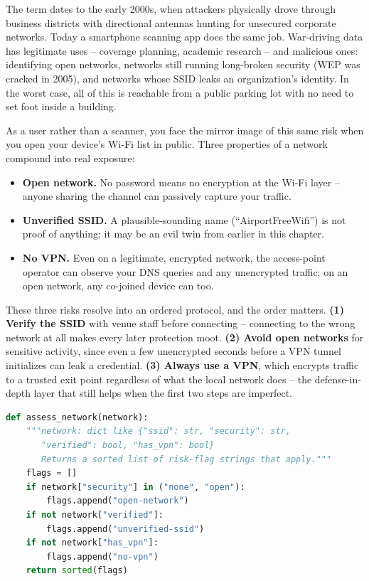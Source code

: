The term dates to the early 2000s, when attackers physically drove through business districts
with directional antennas hunting for unsecured corporate networks. Today a smartphone scanning
app does the same job. War-driving data has legitimate uses -- coverage planning, academic
research -- and malicious ones: identifying open networks, networks still running long-broken
security (WEP was cracked in 2005), and networks whose SSID leaks an organization's identity. In
the worst case, all of this is reachable from a public parking lot with no need to set foot
inside a building.

As a user rather than a scanner, you face the mirror image of this same risk when you open your
device's Wi-Fi list in public. Three properties of a network compound into real exposure:

\begin{itemize}
\item \textbf{Open network.} No password means no encryption at the Wi-Fi layer -- anyone
sharing the channel can passively capture your traffic.
\item \textbf{Unverified SSID.} A plausible-sounding name (``AirportFreeWifi'') is not proof of
anything; it may be an evil twin from earlier in this chapter.
\item \textbf{No VPN.} Even on a legitimate, encrypted network, the access-point operator can
observe your DNS queries and any unencrypted traffic; on an open network, any co-joined device
can too.
\end{itemize}

These three risks resolve into an ordered protocol, and the order matters. \textbf{(1) Verify the
SSID} with venue staff before connecting -- connecting to the wrong network at all makes every
later protection moot. \textbf{(2) Avoid open networks} for sensitive activity, since even a few
unencrypted seconds before a VPN tunnel initializes can leak a credential. \textbf{(3) Always use
a VPN}, which encrypts traffic to a trusted exit point regardless of what the local network does
-- the defense-in-depth layer that still helps when the first two steps are imperfect.

\begin{lstlisting}[language=Python, caption={Flagging the risk properties of a network before connecting}]
def assess_network(network):
    """network: dict like {"ssid": str, "security": str,
       "verified": bool, "has_vpn": bool}
       Returns a sorted list of risk-flag strings that apply."""
    flags = []
    if network["security"] in ("none", "open"):
        flags.append("open-network")
    if not network["verified"]:
        flags.append("unverified-ssid")
    if not network["has_vpn"]:
        flags.append("no-vpn")
    return sorted(flags)
\end{lstlisting}

